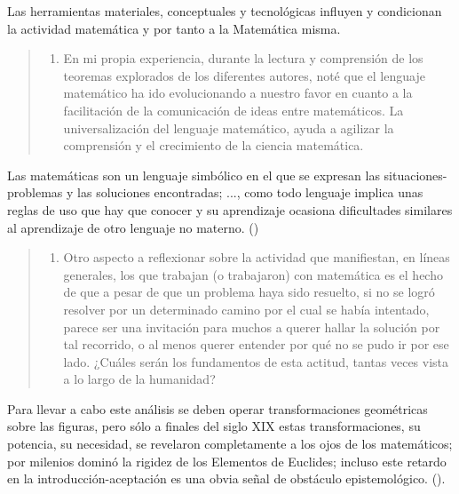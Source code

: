 Las herramientas materiales, conceptuales y tecnológicas influyen y condicionan la actividad matemática y por tanto a la Matemática misma.

\vspace{1em}
\begin{quote}
	\begin{enumerate}[resume=isoper]
		\item En mi propia experiencia, durante la lectura y comprensión de los teoremas explorados de los diferentes autores, noté que el lenguaje matemático ha ido evolucionando a nuestro favor en cuanto a la facilitación de la comunicación de ideas entre matemáticos. La universalización del lenguaje matemático, ayuda a agilizar la comprensión y el crecimiento de la ciencia matemática.
	\end{enumerate}
\end{quote}
\vspace{1em}

Las matemáticas son un lenguaje simbólico en el que se expresan las situaciones-problemas y las soluciones encontradas; ..., como todo lenguaje implica unas reglas de uso que hay que conocer y su aprendizaje ocasiona dificultades similares al aprendizaje de otro lenguaje no materno. (\textcite{godino2003})

\vspace{1em}
\begin{quote}
	\begin{enumerate}[resume=isoper]
		\item Otro aspecto a reflexionar sobre la actividad que manifiestan, en líneas generales, los que trabajan (o trabajaron) con matemática es el hecho de que a pesar de que un problema haya sido resuelto, si no se logró resolver por un determinado camino por el cual se había intentado, parece ser una invitación para muchos a querer hallar la solución por tal recorrido, o al menos querer entender por qué no se pudo ir por ese lado. ¿Cuáles serán los fundamentos de esta actitud, tantas veces vista a lo largo de la humanidad?
	\end{enumerate}
\end{quote}
\vspace{1em}

Para llevar a cabo este análisis se deben operar transformaciones geométricas sobre las figuras, pero sólo a finales del siglo XIX estas transformaciones, su potencia, su necesidad, se revelaron completamente a los ojos de los matemáticos; por milenios dominó la rigidez de los Elementos de Euclides; incluso este retardo en la introducción-aceptación es una obvia señal de obstáculo epistemológico. (\textcite{damore2007}).

